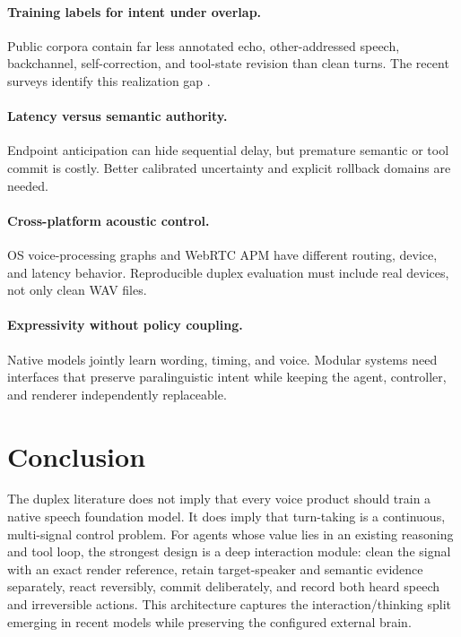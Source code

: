 \documentclass[11pt]{article}
\begin{document}
\paragraph{Training labels for intent under overlap.}
Public corpora contain far less annotated echo, other-addressed speech,
backchannel, self-correction, and tool-state revision than clean turns. The
recent surveys identify this realization gap
\citep{chen2025fdsurvey,lu2026fdsurvey}.

\paragraph{Latency versus semantic authority.}
Endpoint anticipation can hide sequential delay, but premature semantic or tool
commit is costly. Better calibrated uncertainty and explicit rollback domains
are needed.

\paragraph{Cross-platform acoustic control.}
OS voice-processing graphs and WebRTC APM have different routing, device, and
latency behavior. Reproducible duplex evaluation must include real devices, not
only clean WAV files.

\paragraph{Expressivity without policy coupling.}
Native models jointly learn wording, timing, and voice. Modular systems need
interfaces that preserve paralinguistic intent while keeping the agent,
controller, and renderer independently replaceable.

\section{Conclusion}

The duplex literature does not imply that every voice product should train a
native speech foundation model. It does imply that turn-taking is a continuous,
multi-signal control problem. For agents whose value lies in an existing
reasoning and tool loop, the strongest design is a deep interaction module:
clean the signal with an exact render reference, retain target-speaker and
semantic evidence separately, react reversibly, commit deliberately, and
record both heard speech and irreversible actions. This architecture captures
the interaction/thinking split emerging in recent models while preserving the
configured external brain.



\end{document}
